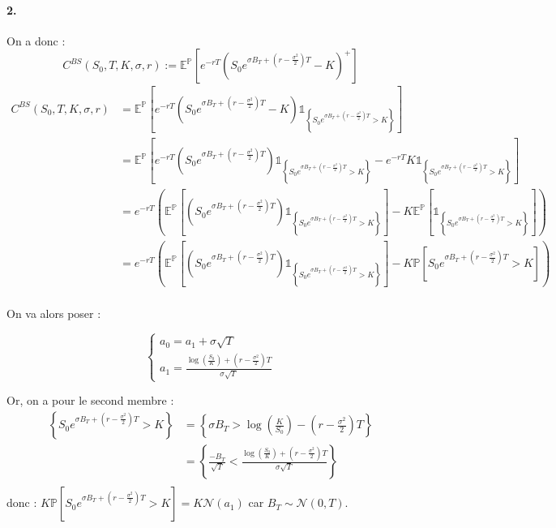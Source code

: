 \documentclass[a4paper,10pt]{report}
\begin{document}

\paragraph*{2.} On a donc :
$$
C^{B S}\left(S_{0}, T, K, \sigma, r\right):=\mathbb{E}^{\mathbb{P}}\left[e^{-r T}\left(S_{0} e^{\sigma B_{T}+\left(r-\frac{\sigma^{2}}{2}\right) T}-K\right)^{+}\right]
$$
$$
\begin{aligned}
C^{B S}\left(S_{0}, T, K, \sigma, r\right) & = \mathbb{E}^{\mathbb{P}}\left[e^{-r T}  \left(S_{0} e^{\sigma B_{T}+\left(r-\frac{\sigma^{2}}{2}\right) T}-K\right)\mathds{1}_{\left\{S_{0} e^{\sigma B_{T}+\left(r-\frac{\sigma^{2}}{2}\right) T} > K \right\}}  \right] \\
& = \mathbb{E}^{\mathbb{P}}\left[e^{-r T}  \left(S_{0} e^{\sigma B_{T}+\left(r-\frac{\sigma^{2}}{2}\right) T}\right)\mathds{1}_{\left\{S_{0} e^{\sigma B_{T}+\left(r-\frac{\sigma^{2}}{2}\right) T} > K \right\}} - e^{-r T} K  \mathds{1}_{\left\{S_{0} e^{\sigma B_{T}+\left(r-\frac{\sigma^{2}}{2}\right) T} > K \right\}}  \right] \\
& = e^{-r T} \left( \mathbb{E}^{\mathbb{P}}\left[    \left(S_{0} e^{\sigma B_{T}+\left(r-\frac{\sigma^{2}}{2}\right) T}\right)\mathds{1}_{\left\{S_{0} e^{\sigma B_{T}+\left(r-\frac{\sigma^{2}}{2}\right) T} > K \right\}} \right] - K \mathbb{E}^{\mathbb{P}}\left[  \mathds{1}_{\left\{S_{0} e^{\sigma B_{T}+\left(r-\frac{\sigma^{2}}{2}\right) T} > K \right\}}  \right] \right) \\
& = e^{-r T} \left( \mathbb{E}^{\mathbb{P}}\left[    \left(S_{0} e^{\sigma B_{T}+\left(r-\frac{\sigma^{2}}{2}\right) T}\right)\mathds{1}_{\left\{S_{0} e^{\sigma B_{T}+\left(r-\frac{\sigma^{2}}{2}\right) T} > K \right\}} \right] - K \mathbb{P} \left[  S_0 e^{\sigma B_T+\left(r-\frac{\sigma^2}{2} \right) T} > K  \right] \right)
\end{aligned}
$$\\
\newline
On va alors poser :

$$
\left\{
\begin{array}{ll}
a_0 = a_1 + \sigma \sqrt{T} \\
a_1 = \frac{\log\left( {\frac{S_0}{K}} \right) + \left( r-\frac{\sigma^{2}}{2} \right) T}{\sigma \sqrt{T}}
\end{array}
\right.
$$

Or, on a pour le second membre :
$$
\begin{aligned}
\left\{S_{0} e^{\sigma B_{T}+\left(r-\frac{\sigma^{2}}{2}\right) T} > K \right\} & = \left\{ \sigma B_{T} > \log \left( {\frac{K}{S_0}} \right) - \left( r-\frac{\sigma^{2}}{2} \right) T \right\} \\ 
& = \left\{ \frac{- B_{T}}{\sqrt{T}} < \frac{\log\left( {\frac{S_0}{K}} \right) + \left( r-\frac{\sigma^{2}}{2} \right) T}{\sigma \sqrt{T}} \right\} \\
\end{aligned}
$$
donc : $K \mathbb{P} \left[  S_0 e^{\sigma B_T+\left(r-\frac{\sigma^2}{2} \right) T} > K  \right] = K \mathcal{N} \left(a_1\right)$  car $ B_T \sim \mathcal{N}(0,T)$.
\end{document}
